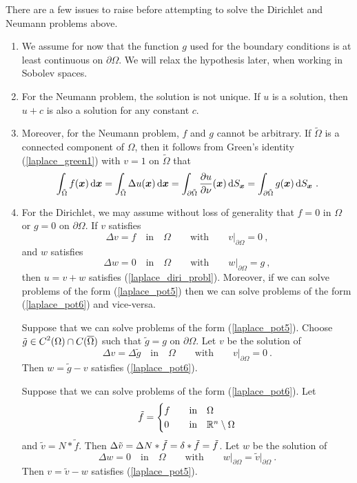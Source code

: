 There are a few issues to raise before attempting to solve the Dirichlet
and Neumann problems above.
\begin{enumerate}
\item We assume for now that the function $g$ used for the boundary
conditions is at least continuous on $\partial \Omega$.  We will
relax the hypothesis later, when working in Sobolev spaces.
\item For the Neumann problem, the solution is not unique.  If $u$ is
a solution, then $u+c$ is also a solution for any constant $c$.
\item Moreover, for the Neumann problem, $f$ and $g$ cannot be
arbitrary.  If $\tilde{\Omega}$ is a connected component of $\Omega$, then it
follows from Green's identity (\ref{laplace_green1}) with $v=1$ on
$\tilde{\Omega}$ that
\[
\int_{\tilde{\Omega}} f(\VEC{x}) \dx{\VEC{x}}
= \int_{\tilde{\Omega}} \Delta u(\VEC{x}) \dx{\VEC{x}}
= \int_{\partial \tilde{\Omega}} \pdydx{u}{\nu}(\VEC{x}) \dss{S}{x}
= \int_{\partial \tilde{\Omega}} g(\VEC{x}) \dss{S}{x} \ .
\]
\item For the Dirichlet, we may assume without loss of generality that
$f=0$ in $\Omega$ or $g=0$ on $\partial \Omega$.
If $v$ satisfies
\begin{equation} \label{laplace_pot5}
\Delta v = f \quad \text{in} \quad \Omega \qquad \text{with}
\qquad v\big|_{\partial \Omega} = 0 \ ,
\end{equation}
and $w$ satisfies
\begin{equation} \label{laplace_pot6}
\Delta w = 0 \quad \text{in} \quad \Omega \qquad \text{with}
\qquad w\big|_{\partial \Omega} = g \ ,
\end{equation}
then $u=v+w$ satisfies (\ref{laplace_diri_probl}).  Moreover, if we
can solve problems of the form (\ref{laplace_pot5}) then we can solve
problems of the form (\ref{laplace_pot6}) and vice-versa.

Suppose that we can solve problems of the form (\ref{laplace_pot5}).
Choose $\displaystyle \tilde{g} \in C^2(\Omega) \cap C(\overline{\Omega})$
such that $\tilde{g} = g$ on $\partial \Omega$.  Let $v$ be the solution of
\[
\Delta v = \Delta \tilde{g} \quad \text{in} \quad \Omega \qquad \text{with}
\qquad v\big|_{\partial \Omega} = 0 \ .
\]
Then $w=\tilde{g}-v$ satisfies (\ref{laplace_pot6}).

Suppose that we can solve problems of the form (\ref{laplace_pot6}).
Let
\[
\tilde{f} =
\begin{cases}
f & \quad \text{in} \quad \Omega \\
0 & \quad \text{in} \quad \mathbb{R}^n\setminus \Omega
\end{cases}
\]
and $\tilde{v} = N\ast \tilde{f}$.  Then
$\displaystyle
\Delta \tilde{v} = \Delta N \ast \tilde{f} = \delta \ast \tilde{f} =
\tilde{f}$.  Let $w$ be the solution of
\[
\Delta w = 0 \quad \text{in} \quad \Omega \qquad \text{with}
\qquad w\big|_{\partial \Omega} = \tilde{v}\big|_{\partial \Omega} \ .
\]
Then $v=\tilde{v}-w$ satisfies (\ref{laplace_pot5}).


\end{enumerate}
